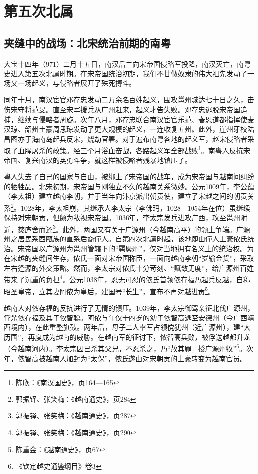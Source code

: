 \chapter{第五次北属}

\section{夹缝中的战场：北宋统治前期的南粤}

\indent 大宝十四年（971）二月十五日，南汉后主向宋帝国侵略军投降，南汉灭亡，南粤史进入第五次北属时期。在宋帝国统治初期，我们不甘做奴隶的伟大祖先发动了一场又一场起义，与侵略者展开了殊死搏斗。

同年十月，南汉宦官邓存忠发动二万余名百姓起义，围攻邕州城达七十日之久，击伤宋守将范旻。直至宋军援兵从广州赶来，起义才告失败。邓存忠逃脱宋帝国追捕，继续与侵略者周旋。次年八月，邓存忠联合南汉宦官乐范、春恩道都指挥使麦汉琼、韶州土豪周思琼发动了更大规模的起义，一连收复五州。此外，崖州牙校陆昌图亦于海南岛起兵反宋，烧劫官署。对于遍布南粤各地的起义军，赵宋侵略者采取了血腥屠杀的政策。经三个月浴血奋战，各路起义军全部战败\footnote{陈欣：《南汉国史》，页164—165}。南粤人反抗宋帝国、复兴南汉的英勇斗争，就这样被侵略者残暴地镇压了。

粤人失去了自己的国家与自由，被绑上了宋帝国的战车，成为宋帝国与越南间纠纷的牺牲品。北宋初期，宋帝国与刚独立不久的越南关系微妙。公元1009年，李公蕴（李太祖）建立越南李朝，并于当年向汴京派出朝贡使，建立了宋越之间的朝贡关系\footnote{郭振铎、张笑梅：《越南通史》，页284}。1028年，李太祖崩，其继承人李太宗（李佛玛，1028—1054年在位）虽继续保持对宋朝贡，但颇为敌视宋帝国。1036年，李太宗发兵进攻广西，攻至邕州附近，焚庐舍而还\footnote{郭振铎、张笑梅：《越南通史》，页287}。此外，两国又有关于广源州（今越南高平）的领土争端。广源州之居民系西瓯族的直系后裔僮人。自第四次北属时起，该地即由僮人土豪侬氏统治。宋帝国以广源州为邕州管辖下的“羁縻州”，仅对当地拥有名义上的统治权。为在宋越的夹缝间生存，侬氏一面对宋帝国称臣，一面向越南李朝“岁输金货”，采取左右逢源的外交策略。然而，李太宗对侬氏十分苛刻、“赋敛无度”，给广源州百姓带来了沉重的负担\footnote{郭振铎、张笑梅：《越南通史》，页290}。公元1038年，忍无可忍的侬氏首领侬存福乃起兵反越，自称昭圣皇帝，立其妻阿侬为皇后，建国号“长生”，宣布不再对越进贡\footnote{陈重金：《越南通史》，页67}。

越南人对侬存福的反抗进行了无情的镇压。1039年，李太宗御驾亲征北伐广源州，俘杀侬存福及其子侬智聪。阿侬与年仅十四岁的幼子侬智高逃至安德州（今广西靖西境内），在此重整旗鼓。两年后，母子二人率军占领傥犹州（近广源州），建“大历国”，再度成为越南的威胁。在越南军的征讨下，侬智高兵败，被俘送越都升龙（今越南河内）。李太宗因已杀其父兄，不忍杀之，乃“赦其罪，授广源州牧”\footnote{《钦定越史通鉴纲目》卷3}。次年，侬智高被越南人加封为“太保”，侬氏遂由对宋朝贡的土豪转变为越南官员。

